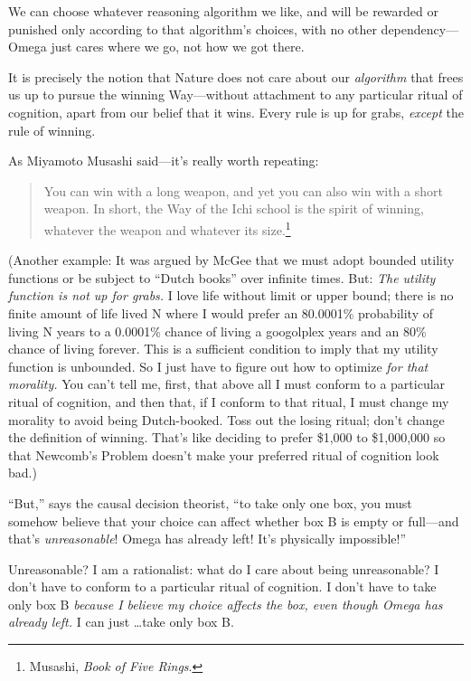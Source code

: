 {
 We can choose whatever reasoning algorithm we like, and will be
rewarded or punished only according to that algorithm's
choices, with no other dependency---Omega just cares where we go, not
how we got there.}

{
 It is precisely the notion that Nature does not care about our
\textit{algorithm} that frees us up to pursue the winning Way---without
attachment to any particular ritual of cognition, apart from our belief
that it wins. Every rule is up for grabs, \textit{except} the rule of
winning.}

{
 As Miyamoto Musashi said---it's really worth
repeating:}

\begin{quote}
{
 You can win with a long weapon, and yet you can also win with a
short weapon. In short, the Way of the Ichi school is the spirit of
winning, whatever the weapon and whatever its size.\footnote{Musashi, \textit{Book of Five Rings}.}}
\end{quote}

{
 (Another example: It was argued by McGee that we must adopt
bounded utility functions or be subject to ``Dutch
books'' over infinite times. But: \textit{The utility
function is not up for grabs.} I love life without limit or upper
bound; there is no finite amount of life lived N where I would prefer
an 80.0001\% probability of living N years to a 0.0001\% chance of
living a googolplex years and an 80\% chance of living forever. This is
a sufficient condition to imply that my utility function is unbounded.
So I just have to figure out how to optimize \textit{for that
morality.} You can't tell me, first, that above all I
must conform to a particular ritual of cognition, and then that, if I
conform to that ritual, I must change my morality to avoid being
Dutch-booked. Toss out the losing ritual; don't change
the definition of winning. That's like deciding to
prefer \$1,000 to \$1,000,000 so that Newcomb's Problem
doesn't make your preferred ritual of cognition look
bad.)}

{
 ``But,'' says the causal
decision theorist, ``to take only one box, you must
somehow believe that your choice can affect whether box B is empty or
full---and that's \textit{unreasonable}! Omega has
already left! It's physically
impossible!''}

{
 Unreasonable? I am a rationalist: what do I care about being
unreasonable? I don't have to conform to a particular
ritual of cognition. I don't have to take only box B
\textit{because I believe my choice affects the box, even though Omega
has already left.} I can just \ldots take only box B.}

